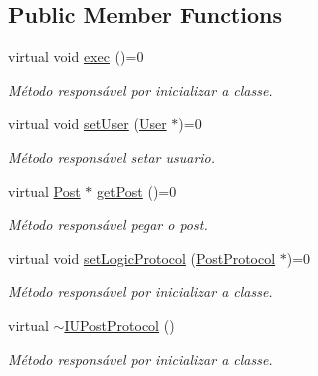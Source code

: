 \subsection*{Public Member Functions}
\begin{DoxyCompactItemize}
\item 
\hypertarget{class_i_u_post_protocol_a918e56d6c181b995b174f76bce262550}{virtual void \hyperlink{class_i_u_post_protocol_a918e56d6c181b995b174f76bce262550}{exec} ()=0}\label{class_i_u_post_protocol_a918e56d6c181b995b174f76bce262550}

\begin{DoxyCompactList}\small\item\em Método responsável por inicializar a classe. \end{DoxyCompactList}\item 
\hypertarget{class_i_u_post_protocol_ac09c65f4441d28a95e8e620529ebf1ac}{virtual void \hyperlink{class_i_u_post_protocol_ac09c65f4441d28a95e8e620529ebf1ac}{set\-User} (\hyperlink{class_user}{User} $\ast$)=0}\label{class_i_u_post_protocol_ac09c65f4441d28a95e8e620529ebf1ac}

\begin{DoxyCompactList}\small\item\em Método responsável setar usuario. \end{DoxyCompactList}\item 
\hypertarget{class_i_u_post_protocol_abd965d8b629bcbe9171e4783c2469c4a}{virtual \hyperlink{class_post}{Post} $\ast$ \hyperlink{class_i_u_post_protocol_abd965d8b629bcbe9171e4783c2469c4a}{get\-Post} ()=0}\label{class_i_u_post_protocol_abd965d8b629bcbe9171e4783c2469c4a}

\begin{DoxyCompactList}\small\item\em Método responsável pegar o post. \end{DoxyCompactList}\item 
\hypertarget{class_i_u_post_protocol_a2eb127e73ef91e53f1fbc30b70438d2e}{virtual void \hyperlink{class_i_u_post_protocol_a2eb127e73ef91e53f1fbc30b70438d2e}{set\-Logic\-Protocol} (\hyperlink{class_post_protocol}{Post\-Protocol} $\ast$)=0}\label{class_i_u_post_protocol_a2eb127e73ef91e53f1fbc30b70438d2e}

\begin{DoxyCompactList}\small\item\em Método responsável por inicializar a classe. \end{DoxyCompactList}\item 
\hypertarget{class_i_u_post_protocol_ab0196d108873247439673b8dbcc9d1ee}{virtual \hyperlink{class_i_u_post_protocol_ab0196d108873247439673b8dbcc9d1ee}{$\sim$\-I\-U\-Post\-Protocol} ()}\label{class_i_u_post_protocol_ab0196d108873247439673b8dbcc9d1ee}

\begin{DoxyCompactList}\small\item\em Método responsável por inicializar a classe. \end{DoxyCompactList}\end{DoxyCompactItemize}


